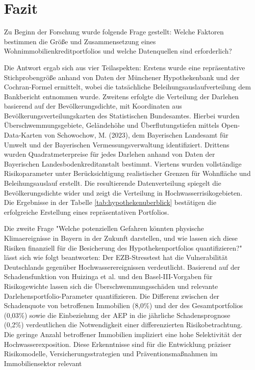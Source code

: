 \section{Fazit}
Zu Beginn der Forschung wurde folgende Frage gestellt:
Welche Faktoren bestimmen die Größe und Zusammensetzung eines Wohnimmobilienkreditportfolios und welche Datenquellen sind erforderlich?

Die Antwort ergab sich aus vier Teilaspekten: Erstens wurde eine repräsentative Stichprobengröße anhand von Daten der Münchener Hypothekenbank und der Cochran-Formel ermittelt, wobei die tatsächliche Beleihungsauslaufverteilung dem Bankbericht entnommen wurde. Zweitens erfolgte die Verteilung der Darlehen basierend auf der Bevölkerungsdichte, mit Koordinaten aus Bevölkerungsverteilungskarten des Statistischen Bundesamtes. Hierbei wurden Überschwemmungsgebiete, Geländehöhe und Überflutungstiefen mittels Open-Data-Karten von Schowochow, M. (2023), dem Bayerischen Landesamt für Umwelt und der Bayerischen Vermessungsverwaltung identifiziert. Drittens wurden Quadratmeterpreise für jedes Darlehen anhand von Daten der Bayerischen Landesbodenkreditanstalt bestimmt. Viertens wurden vollständige Risikoparameter unter Berücksichtigung realistischer Grenzen für Wohnfläche und Beleihungsauslauf erstellt. Die resultierende Datenverteilung spiegelt die Bevölkerungsdichte wider und zeigt die Verteilung in Hochwasserrisikogebieten. Die Ergebnisse in der Tabelle \ref{tab:hypothekenuberblick} bestätigen die erfolgreiche Erstellung eines repräsentativen Portfolios.

Die zweite Frage "Welche potenziellen Gefahren könnten physische Klimaereignisse in Bayern in der Zukunft darstellen, und wie lassen sich diese Risiken finanziell für die Besicherung des Hypothekenportfolios quantifizieren?" lässt sich wie folgt beantworten: Der EZB-Stresstest hat die Vulnerabilität Deutschlands gegenüber Hochwasserereignissen verdeutlicht. Basierend auf der Schadensfunktion von Huizinga et al. und den Basel-III-Vorgaben für Risikogewichte lassen sich die Überschwemmungsschäden und relevante Darlehensportfolio-Parameter quantifizieren.  Die Differenz zwischen der Schadenquote von betroffenen Immobilien (8,0\%) und der des Gesamtportfolios (0,03\%) sowie die Einbeziehung der AEP in die jährliche Schadensprognose (0,2\%) verdeutlichen die Notwendigkeit einer differenzierten Risikobetrachtung. Die geringe Anzahl betroffener Immobilien impliziert eine hohe Selektivität der Hochwasserexposition. Diese Erkenntnisse sind für die Entwicklung präziser Risikomodelle, Versicherungsstrategien und Präventionsmaßnahmen im Immobiliensektor relevant

